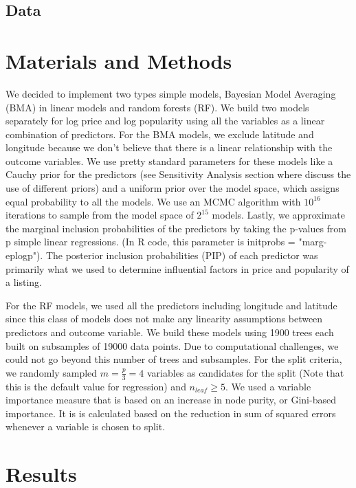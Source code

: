 \documentclass{article}
\begin{document}
\subsection{Data} 



\section{Materials and Methods} 

We decided to implement two types simple models, Bayesian Model Averaging (BMA) in linear models and random forests (RF). We build two models separately for log price and log popularity using all the variables as a linear combination of predictors. For the BMA models, we exclude latitude and longitude because we don't believe that there is a linear relationship with the outcome variables. We use pretty standard parameters for these models like a Cauchy prior for the predictors (see Sensitivity Analysis section where discuss the use of different priors) and a uniform prior over the model space, which assigns equal probability to all the models. We use an MCMC algorithm with $10^{16}$ iterations to sample from the model space of $2^{15}$ models. Lastly, we approximate the marginal inclusion probabilities of the predictors by taking the p-values from p simple linear regressions. (In R code, this parameter is initprobs = "marg-eplogp"). The posterior inclusion probabilities (PIP) of each predictor was primarily what we used to determine influential factors in price and popularity of a listing. 

For the RF models, we used all the predictors including longitude and latitude since this class of models does not make any linearity assumptions between predictors and outcome variable. We build these models using 1900 trees each built on subsamples of 19000 data points. Due to computational challenges, we could not go beyond this number of trees and subsamples. For the split criteria, we randomly sampled $m = \frac{p}{3} = 4$ variables as candidates for the split (Note that this is the default value for regression) and $n_{leaf} \geq 5$. We used a variable importance measure that is based on an increase in node purity, or Gini-based importance. It is is calculated based on the reduction in sum of squared errors whenever a variable is chosen to split.

\section{Results}
\end{document}
